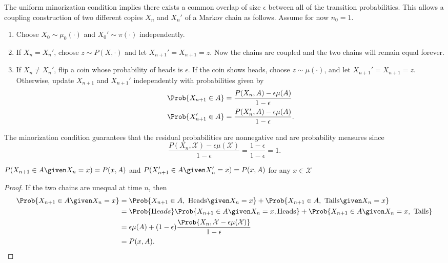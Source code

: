\documentclass[12pt]{article}
\begin{document}
The uniform minorization condition implies there exists a common overlap
of size \( \epsilon \) between all of the transition probabilities. This
allows a coupling construction of two different copies \( X_n \) and \(
X_n' \) of a Markov chain as follows.  Assume for now \( n_0 = 1 \).
\begin{enumerate}
    \item
        Choose \( X_0 \sim \mu_0(\cdot) \) and \( X_0' \sim \pi(\cdot) \)
        independently.
    \item
        If \( X_n = X_n' \), choose \( z \sim P(X, \cdot) \) and let \(
        X_{n+1}' = X_{n+1} = z \).  Now the chains are coupled and the
        two chains will remain equal forever.
    \item
        If \( X_n \ne X_n' \), flip a coin whose probability of heads is
        \( \epsilon \).  If the coin shows heads, choose \( z \sim \mu(\cdot)
        \), and let \( X_{n+1}' = X_{n+1} = z \).  Otherwise, update \(
        X_{n+1} \) and \( X_{n+1}' \) independently with probabilities
        given by
        \begin{align*}
            \Prob{X_{n+1} \in A} &= \frac{P(X_n, A) - \epsilon \mu(A)}{1-\epsilon}
            \\
            \Prob{X_{n+1}' \in A} &= \frac{P(X_n', A) - \epsilon \mu(A)}
            {1-\epsilon}.  \\
        \end{align*}
\end{enumerate}

The minorization condition guarantees that the residual probabilities
are nonnegative and are probability measures since
\[
    \frac{P(X_n, \mathcal{X}) - \epsilon \mu(\mathcal{X})}{1-\epsilon} =
    \frac{1-\epsilon}{1-\epsilon} = 1.
\]

\begin{lemma}
    \( P(X_{n+1} \in A \given X_n = x) = P(x,A) \) and \( P(X_{n+1}' \in
    A \given X_n' = x) = P(x,A) \) for any \( x \in \mathcal{X} \)
\end{lemma}

\begin{proof}
    If the two chains are unequal at time \( n \), then
    \begin{align*}
        \Prob{X_{n+1} \in A \given X_n = x} &= \Prob{X_{n+1} \in A,\text
        { Heads} \given X_n = x} + \Prob{X_{n+1} \in A,\text{ Tails}
        \given X_n = x} \\
        &= \Prob{\text Heads} \Prob{X_{n+1} \in A \given X_n = x, \text{%
        Heads}} + \Prob{X_{n+1} \in A \given X_n = x, \text{ Tails} } \\
        &= \epsilon \mu(A) + (1-\epsilon) \frac{\Prob{X_n, \mathcal{X} -
        \epsilon \mu(\mathcal{X})}}{1-\epsilon} \\
        &= P(x,A).
    \end{align*}
\end{proof}
\end{document}
